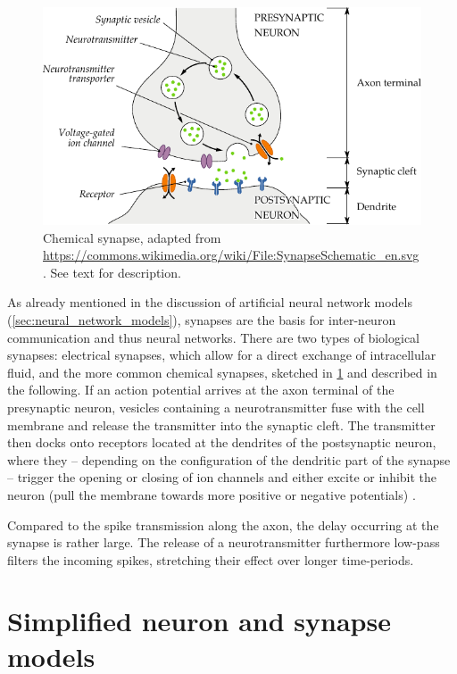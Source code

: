 \begin{figure}
	\centering
	\includegraphics{media/chp2/SynapseSchematic_en.pdf}
	\caption[Chemical synapse schematic]{Chemical synapse, adapted from \url{https://commons.wikimedia.org/wiki/File:SynapseSchematic_en.svg}. See text for description.}
	\label{fig:chemical_synapse}
\end{figure}

As already mentioned in the discussion of artificial neural network models (\cref{sec:neural_network_models}), synapses are the basis for inter-neuron communication and thus neural networks. There are two types of biological synapses: electrical synapses, which allow for a direct exchange of intracellular fluid, and the more common chemical synapses, sketched in \cref{fig:chemical_synapse} and described in the following. If an action potential arrives at the axon terminal of the presynaptic neuron, vesicles containing a neurotransmitter fuse with the cell membrane and release the transmitter into the synaptic cleft. The transmitter then docks onto receptors located at the dendrites of the postsynaptic neuron, where they -- depending on the configuration of the dendritic part of the synapse -- trigger the opening or closing of ion channels and either excite or inhibit the neuron (pull the membrane towards more positive or negative potentials) \cite{kandel2012principles}.

Compared to the spike transmission along the axon, the delay occurring at the synapse is rather large. The release of a neurotransmitter furthermore low-pass filters the incoming spikes, stretching their effect over longer time-periods.

\section{Simplified neuron and synapse models}
\label{sec:spiking_neuron_models}

